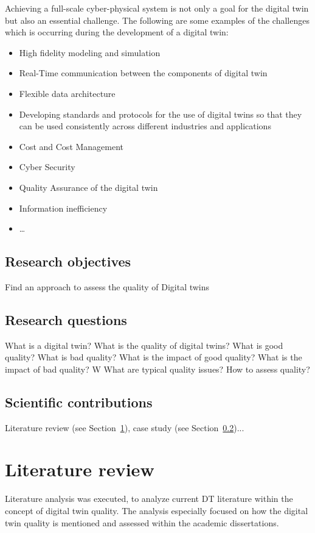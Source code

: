 \documentclass[9pt,conference]{IEEEtran}
\begin{document}
    Achieving a full-scale cyber-physical system is not only a goal for the digital twin but also an essential challenge. The following are some examples of the challenges which is occurring during the development of a digital twin:
    \begin{itemize}
        \item High fidelity modeling and simulation
        \item Real-Time communication between the components of digital twin 
        \item Flexible data architecture
        \item Developing standards and protocols for the use of digital twins so that they can be used consistently across different 
        industries and applications
        \item Cost and Cost Management
        \item Cyber Security
        \item Quality Assurance of the digital twin
        \item Information inefficiency
        \item \dots{}
    \end{itemize}
    
    \subsection{Research objectives}
    Find an approach to assess the quality of Digital twins

    \subsection{Research questions}
    \label{section: Research Questions}
    What is a digital twin?
    What is the quality of digital twins? 
    What is good quality?
    What is bad quality? 
    What is the impact of good quality? 
    What is the impact of bad quality? W
    What are typical quality issues? 
    How to assess quality?

    \subsection{Scientific contributions}
    Literature review (see Section~\ref{section: literature}), case study (see Section~\ref{section: Research Questions})...
    
    \section{Literature review}
    \label{section: literature}
    Literature analysis was executed, to analyze current DT literature within the concept of digital twin quality. The analysis especially focused on 
    how the digital twin quality is mentioned and assessed within the academic dissertations.
\end{document}
